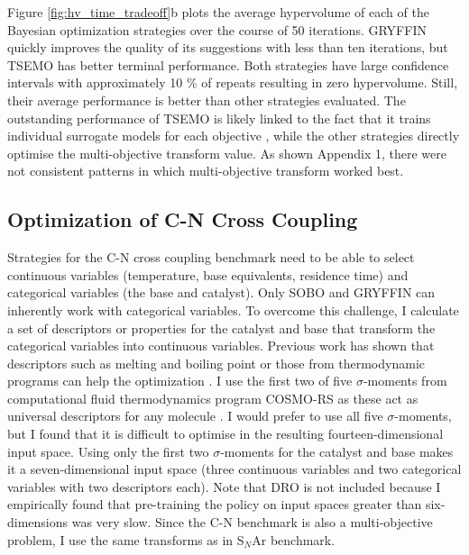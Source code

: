 Figure \ref{fig:hv_time_tradeoff}b plots the average hypervolume of each of the Bayesian optimization strategies over the course of 50 iterations. GRYFFIN quickly improves the quality of its suggestions with less than ten iterations, but TSEMO has better terminal performance. Both strategies have large confidence intervals with approximately 10 \% of repeats resulting in zero hypervolume. Still, their average performance is better than other strategies evaluated. The outstanding performance of TSEMO is likely linked to the fact that it trains individual surrogate models for each objective \cite{Bradford2018}, while the other strategies directly optimise the multi-objective transform value. As shown Appendix 1, there were not consistent patterns in which multi-objective transform worked best.

\subsection{Optimization of C-N Cross Coupling}

Strategies for the C-N cross coupling benchmark need to be able to select continuous variables (temperature, base equivalents, residence time) and categorical variables (the base and catalyst). Only SOBO and GRYFFIN can inherently work with categorical variables. To overcome this challenge, I calculate a set of descriptors or properties for the catalyst and base that transform the categorical variables into continuous variables. Previous work has shown that descriptors such as melting and boiling point or those from thermodynamic programs can help the optimization \cite{Amar2019, Hase2020a}. I use the first two of five $\sigma$-moments from computational fluid thermodynamics program COSMO-RS as these act as universal descriptors for any molecule \cite{Zissimos2002}. I would prefer to use all five $\sigma$-moments, but I found that it is difficult to optimise in the resulting fourteen-dimensional input space. Using only the first two $\sigma$-moments for the catalyst and base makes it a seven-dimensional input space (three continuous variables and two categorical variables with two descriptors each).  Note that DRO is not included because I empirically found that pre-training the policy on input spaces greater than six-dimensions was very slow. Since the C-N benchmark is also a multi-objective problem, I use the same transforms as in S$_N$Ar benchmark.

